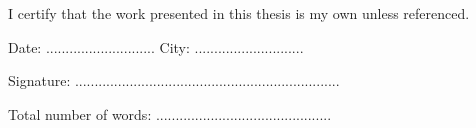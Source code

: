 \begin{flushleft}
\vspace{1cm}

I certify that the work presented in this thesis is my own unless referenced.


\vspace{0.5cm}

Date: ............................
\hspace{1cm} 
City: ............................ 

\vspace{0.5cm}
Signature: ....................................................................

\vspace{0.5cm}
Total number of words: .............................................

\end{flushleft}

\vspace*{\fill}
\pagebreak